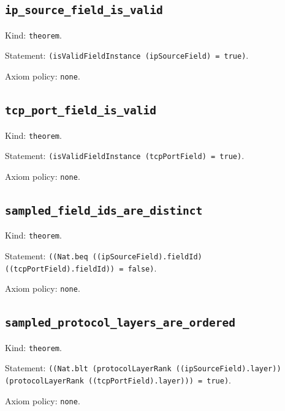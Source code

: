 \documentclass[11pt]{article}
\begin{document}
\subsection*{\texttt{ip\_source\_field\_is\_valid}}
\noindent Kind: \texttt{theorem}.\par
\noindent Statement: \texttt{(isValidFieldInstance (ipSourceField) = true)}.\par
\noindent Axiom policy: \texttt{none}.\par
\subsection*{\texttt{tcp\_port\_field\_is\_valid}}
\noindent Kind: \texttt{theorem}.\par
\noindent Statement: \texttt{(isValidFieldInstance (tcpPortField) = true)}.\par
\noindent Axiom policy: \texttt{none}.\par
\subsection*{\texttt{sampled\_field\_ids\_are\_distinct}}
\noindent Kind: \texttt{theorem}.\par
\noindent Statement: \texttt{((Nat.beq ((ipSourceField).fieldId) ((tcpPortField).fieldId)) = false)}.\par
\noindent Axiom policy: \texttt{none}.\par
\subsection*{\texttt{sampled\_protocol\_layers\_are\_ordered}}
\noindent Kind: \texttt{theorem}.\par
\noindent Statement: \texttt{((Nat.blt (protocolLayerRank ((ipSourceField).layer)) (protocolLayerRank ((tcpPortField).layer))) = true)}.\par
\noindent Axiom policy: \texttt{none}.\par
\end{document}
